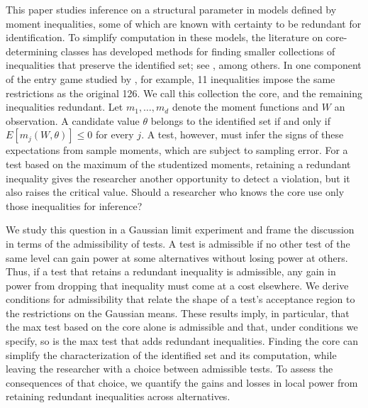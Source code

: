 \documentclass[11pt]{article}
\numberwithin{equation}{section}
\theoremstyle{definition}
\begin{document}
This paper studies inference on a structural parameter in models defined by moment inequalities, some of which are known with certainty to be redundant for identification. To simplify computation in these models, the literature on core-determining classes has developed methods for finding smaller collections of inequalities that preserve the identified set; see \cite{galichon/henry:11, chesher/rosen:20,molinari:20, luo/ponomarev/wang:26}, among others. In one component of the entry game studied by \cite{luo/wang:18}, for example, 11 inequalities impose the same restrictions as the original 126. We call this collection the core, and the remaining inequalities redundant. Let $m_1,\dots,m_d$ denote the moment functions and $W$ an observation. A candidate value $\theta$ belongs to the identified set if and only if $E[m_j(W,\theta)]\leq 0$ for every $j$. A test, however, must infer the signs of these expectations from sample moments, which are subject to sampling error. For a test based on the maximum of the studentized moments, retaining a redundant inequality gives the researcher another opportunity to detect a violation, but it also raises the critical value. Should a researcher who knows the core use only those inequalities for inference? 

We study this question in a Gaussian limit experiment and frame the discussion in terms of the admissibility of tests. A test is admissible if no other test of the same level can gain power at some alternatives without losing power at others. Thus, if a test that retains a redundant inequality is admissible, any gain in power from dropping that inequality must come at a cost elsewhere. We derive conditions for admissibility that relate the shape of a test’s acceptance region to the restrictions on the Gaussian means. These results imply, in particular, that the max test based on the core alone is admissible and that, under conditions we specify, so is the max test that adds redundant inequalities. Finding the core can simplify the characterization of the identified set and its computation, while leaving the researcher with a choice between admissible tests. To assess the consequences of that choice, we quantify the gains and losses in local power from retaining redundant inequalities across alternatives.
\end{document}
